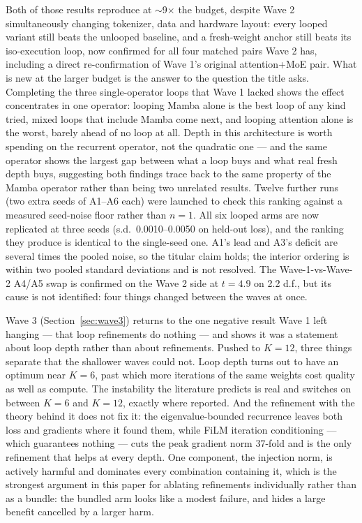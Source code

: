 \documentclass[11pt,a4paper]{article}
\begin{document}
Both of those results reproduce at $\sim$9$\times$ the budget, despite Wave 2 simultaneously
changing tokenizer, data and hardware layout: every looped variant still beats the unlooped
baseline, and a fresh-weight anchor still beats its iso-execution loop, now confirmed for all four
matched pairs Wave 2 has, including a direct re-confirmation of Wave 1's original attention+MoE
pair. What is new at the larger budget is the answer to the question the title asks. Completing the
three single-operator loops that Wave 1 lacked shows the effect concentrates in one operator:
looping Mamba alone is the best loop of any kind tried, mixed loops that include Mamba come next,
and looping attention alone is the worst, barely ahead of no loop at all. Depth in this architecture
is worth spending on the recurrent operator, not the quadratic one --- and the same operator shows
the largest gap between what a loop buys and what real fresh depth buys, suggesting both findings
trace back to the same property of the Mamba operator rather than being two unrelated results.
Twelve further runs (two extra seeds of A1--A6 each) were launched to check this ranking against a
measured seed-noise floor rather than $n=1$. All six looped arms are now replicated at three seeds
(s.d.\ 0.0010--0.0050 on held-out loss), and the ranking they produce is identical to the
single-seed one. A1's lead and A3's deficit are several times the pooled noise, so the titular claim
holds; the interior ordering is within two pooled standard deviations and is not resolved. The
Wave-1-vs-Wave-2 A4/A5 swap is confirmed on the Wave 2 side at $t = 4.9$ on 2.2 d.f., but its cause
is not identified: four things changed between the waves at once.

Wave 3 (Section~\ref{sec:wave3}) returns to the one negative result Wave 1 left hanging --- that
loop refinements do nothing --- and shows it was a statement about loop depth rather than about
refinements. Pushed to $K{=}12$, three things separate that the shallower waves could not. Loop depth
turns out to have an optimum near $K{=}6$, past which more iterations of the same weights cost
quality as well as compute. The instability the literature predicts is real and switches on between
$K{=}6$ and $K{=}12$, exactly where reported. And the refinement with the theory behind it does not
fix it: the eigenvalue-bounded recurrence leaves both loss and gradients where it found them, while
FiLM iteration conditioning --- which guarantees nothing --- cuts the peak gradient norm 37-fold and
is the only refinement that helps at every depth. One component, the injection norm, is actively
harmful and dominates every combination containing it, which is the strongest argument in this paper
for ablating refinements individually rather than as a bundle: the bundled arm looks like a modest
failure, and hides a large benefit cancelled by a larger harm.
\end{document}
